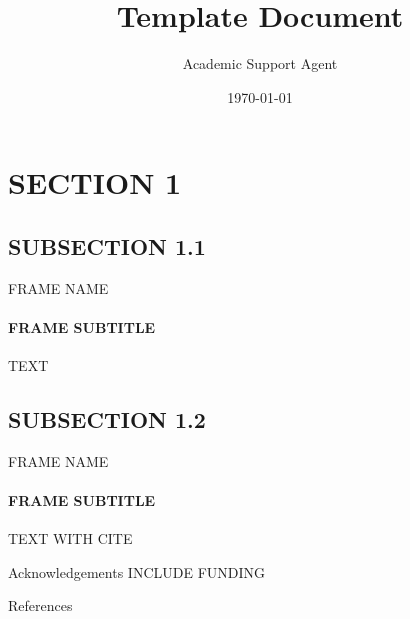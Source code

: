 \documentclass{article}
\title{Template Document}
\author{Academic Support Agent}
\date{\today}
\begin{document}
\maketitle


\typesetFrontSlides


%
%

\section{SECTION 1}

\subsection{SUBSECTION 1.1}


\begin{frame}{FRAME NAME}
\framesubtitle{FRAME SUBTITLE}

TEXT

\end{frame}


\subsection{SUBSECTION 1.2}

\begin{frame}{FRAME NAME}
	\framesubtitle{FRAME SUBTITLE}
TEXT WITH CITE \cite{hochreiter1997long}
\end{frame}

%
%

\begin{frame}{Acknowledgements}
  \centering
INCLUDE FUNDING

\end{frame}

\begin{frame}[allowframebreaks]{References}


\end{frame}

\end{document}
